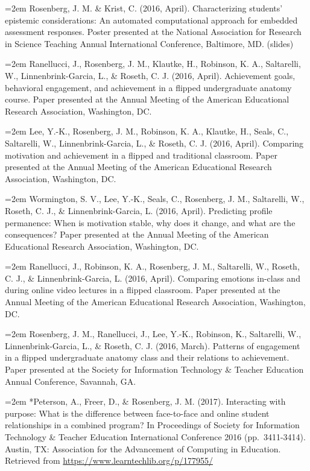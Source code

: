 \documentclass[]{article}
\begin{document}
\hangindent=2em Rosenberg, J. M. \& Krist, C. (2016, April).
Characterizing students' epistemic considerations: An automated
computational approach for embedded assessment responses. Poster
presented at the National Association for Research in Science Teaching
Annual International Conference, Baltimore, MD. (slides)

\hangindent=2em Ranellucci, J., Rosenberg, J. M., Klautke, H., Robinson,
K. A., Saltarelli, W., Linnenbrink-Garcia, L., \& Roseth, C. J. (2016,
April). Achievement goals, behavioral engagement, and achievement in a
flipped undergraduate anatomy course. Paper presented at the Annual
Meeting of the American Educational Research Association, Washington,
DC.

\hangindent=2em Lee, Y.-K., Rosenberg, J. M., Robinson, K. A., Klautke,
H., Seals, C., Saltarelli, W., Linnenbrink-Garcia, L., \& Roseth, C. J.
(2016, April). Comparing motivation and achievement in a flipped and
traditional classroom. Paper presented at the Annual Meeting of the
American Educational Research Association, Washington, DC.

\hangindent=2em Wormington, S. V., Lee, Y.-K., Seals, C., Rosenberg, J.
M., Saltarelli, W., Roseth, C. J., \& Linnenbrink-Garcia, L. (2016,
April). Predicting profile permanence: When is motivation stable, why
does it change, and what are the consequences? Paper presented at the
Annual Meeting of the American Educational Research Association,
Washington, DC.

\hangindent=2em Ranellucci, J., Robinson, K. A., Rosenberg, J. M.,
Saltarelli, W., Roseth, C. J., \& Linnenbrink-Garcia, L. (2016, April).
Comparing emotions in-class and during online video lectures in a
flipped classroom. Paper presented at the Annual Meeting of the American
Educational Research Association, Washington, DC.

\hangindent=2em Rosenberg, J. M., Ranellucci, J., Lee, Y.-K., Robinson,
K., Saltarelli, W., Linnenbrink-Garcia, L., \& Roseth, C. J. (2016,
March). Patterns of engagement in a flipped undergraduate anatomy class
and their relations to achievement. Paper presented at the Society for
Information Technology \& Teacher Education Annual Conference, Savannah,
GA.

\hangindent=2em *Peterson, A., Freer, D., \& Rosenberg, J. M. (2017).
Interacting with purpose: What is the difference between face-to-face
and online student relationships in a combined program? In Proceedings
of Society for Information Technology \& Teacher Education International
Conference 2016 (pp.~3411-3414). Austin, TX: Association for the
Advancement of Computing in Education. Retrieved from
\url{https://www.learntechlib.org/p/177955/}
\end{document}
